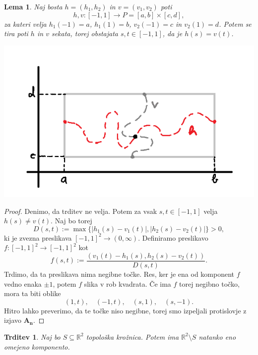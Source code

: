 \documentclass[10pt, a4paper]{article}
\newtheorem{trditev}[izr]{Trditev}
\newtheorem{lema}[izr]{Lema}
\newenvironment{noticeC}{%
  \tcolorbox[%
  notitle,
  empty,
  enhanced,  %
  breakable,
  coltext=black, 
  fontupper=\rmfamily,
  noparskip,
  sharp corners,
  boxrule=-1pt,  %
  frame hidden,
  left=7pt,  %
  right=7pt,
  top=5pt,
  bottom=5pt,
  before skip=2.5ex plus 2pt,
  after skip=2.5ex plus 2pt,
  overlay unbroken and last={%
  },
  ]}
{\endtcolorbox}
\newenvironment{dokaz}%
  {\begin{noticeC}\begin{proof}}%
  {\end{proof}\end{noticeC}}
\newcommand{\R}{\mathbb {R}}
\begin{document}
\begin{lema}
  Naj bosta $h = (h_1, h_2)$ in $v = (v_1, v_2)$ poti 
  $$h, v: [-1, 1] \to P = [a, b] \times [c, d],$$
  za kateri velja $h_1 (-1) = a$, $h_1 (1) = b$, $v_2 (-1) = c$ in $v_2 (1) = d$.
  Potem se tira poti $h$ in $v$ sekata, torej obstajata $s, t \in [-1, 1]$, da je $h(s) = v(t)$.
  \begin{center}
    \includegraphics[scale=0.6]{lema1.png}
  \end{center}
\end{lema}

\begin{dokaz}
  Denimo, da trditev ne velja. Potem za vsak $s, t \in [-1, 1]$ velja $h(s) \neq v(t)$.
  Naj bo torej $$D(s, t) := \max \{|h_1 (s) - v_1 (t)|, |h_2 (s) - v_2 (t)|\} > 0,$$
  ki je zvezna preslikava $[-1, 1]^2 \to (0, \infty)$.
  Definiramo preslikavo $f: [-1, 1]^2 \to [-1, 1]^2$ kot 
  $$f(s, t) := \frac{(v_1 (t) - h_1 (s), h_2 (s) - v_2 (t))}{D(s, t)}.$$
  Trdimo, da ta preslikava nima negibne točke. Res, ker je ena od komponent $f$ vedno enaka $\pm 1$, 
  potem $f$ slika v rob kvadrata. Če ima $f$ torej negibno točko, mora ta biti oblike 
  $$(1, t),\quad (-1, t),\quad (s, 1),\quad (s, -1).$$
  Hitro lahko preverimo, da te točke niso negibne, torej smo izpeljali protislovje z izjavo $\mathbf{A_n}$.
\end{dokaz}

\begin{trditev}
  Naj bo $S \subseteq \R^2$ topološka krožnica. Potem ima $\R^2 \setminus S$ natanko eno omejeno komponento. 
\end{trditev}
\end{document}
